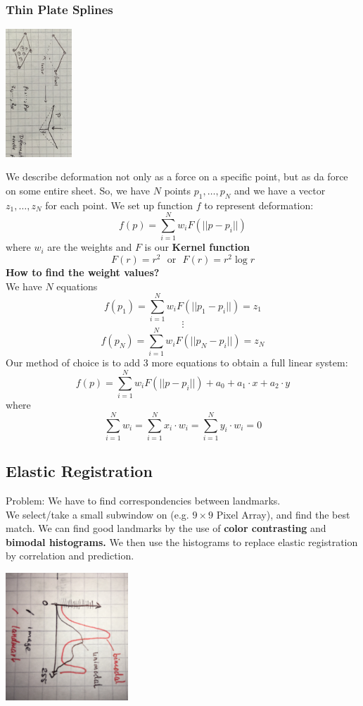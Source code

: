 \documentclass{exerciseBlue}
\begin{document}
\subsubsection{Thin Plate Splines}
\begin{center}
	\includegraphics[height = 4.8cm]{Images/ThinPlaneSplines}
\end{center}
We describe deformation not only as a force on a specific point, but as da force on some entire sheet. So, we have $N$ points $p_1, \dots , p_N$ and we have a vector $z_1,\dots, z_N$ for each point. We set up function $f$ to represent deformation:
$$f(p) = \sum_{i=1}^{N} w_iF(||p-p_i||)$$
where $w_i$ are the weights and $F$ is our \textbf{Kernel function} 
$$F(r) = r^2 \ \ \ \text{or} \ \ \ F(r)=r^2\log r$$
\textbf{How to find the weight values?}\\
We have $N$ equations
$$f(p_1) = \sum_{i=1}^{N} w_iF(||p_1-p_i||) = z_1$$
$$\vdots$$
$$f(p_N) = \sum_{i=1}^{N} w_iF(||p_N-p_i||) = z_N$$
Our method of choice is to add 3 more equations to obtain a full linear system:
$$f(p) = \sum_{i=1}^{N} w_iF(||p-p_i||) + a_0 + a_1\cdot x + a_2\cdot y$$
where
$$\sum_{i=1}^{N}w_i = \sum_{i=1}^{N}x_i\cdot w_i = \sum_{i=1}^{N}y_i\cdot w_i = 0$$
\subsection{Elastic Registration}
Problem: We have to find correspondencies between landmarks.\\
We select/take a small subwindow on (e.g. $9\times9$ Pixel Array), and find the best match. We can find good landmarks by the use of \textbf{color contrasting} and \textbf{bimodal histograms.} We then use the histograms to replace elastic registration by correlation and prediction.
\begin{center}
	\includegraphics[height = 4.8cm]{Images/Bimodal}
\end{center}
\end{document}
